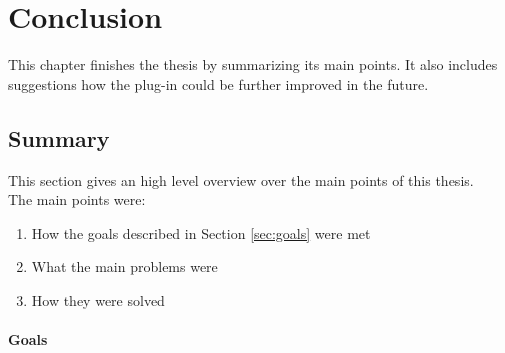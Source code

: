 
\chapter{Conclusion}
\label{chap:conclusion}

This chapter finishes the thesis by summarizing its main points. It also includes suggestions how the plug-in could be further improved in the future.

\section{Summary}
\label{sec:summary}

This section gives an high level overview over the main points of this thesis. \\
The main points were:

\begin{enumerate}
\item How the goals described in Section \ref{sec:goals} were met
\item What the main problems were
\item How they were solved
\end{enumerate}

\subsubsection{Goals}

